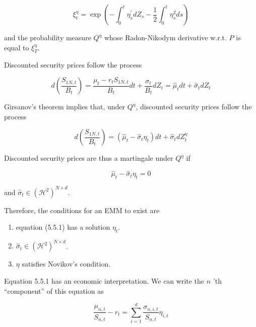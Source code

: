 \documentclass[\topdir/lecture\_notes.tex]{subfiles}
\begin{document}
\begin{equation*}
\xi_{t}^{\eta}=\exp \left(-\int_{0}^{t} \eta_{s}^{\prime} d Z_{s}-\frac{1}{2} \int_{0}^{t} \eta_{s}^{2} d s\right)
\end{equation*}

and the probability measure \(Q^{\eta}\) whose Radon-Nikodym derivative w.r.t. \(P\) is equal to \(\xi_{T}^{\eta}\).

Discounted security prices follow the process

\begin{equation*}
d\left(\frac{S_{1 N, t}}{B_{t}}\right)=\frac{\mu_{t}-r_{t} S_{1 N, t}}{B_{t}} d t+\frac{\sigma_{t}}{B_{t}} d Z_{t}=\hat{\mu}_{t} d t+\hat{\sigma}_{t} d Z_{t}
\end{equation*}

Girsanov's theorem implies that, under \(Q^{\eta}\), discounted security prices follow the process

\begin{equation*}
d\left(\frac{S_{1 N, t}}{B_{t}}\right)=\left(\hat{\mu}_{t}-\hat{\sigma}_{t} \eta_{t}\right) d t+\hat{\sigma}_{t} d Z_{t}^{\eta}
\end{equation*}

Discounted security prices are thus a martingale under \(Q^{\eta}\) if

\begin{equation}
\hat{\mu}_{t}-\hat{\sigma}_{t} \eta_{t}=0 \label{eq:martingale_condition}
\end{equation}

and \(\hat{\sigma}_{t} \in\left(\mathcal{H}^{2}\right)^{N \times d}\).

Therefore, the conditions for an EMM to exist are

\begin{enumerate}
  \item equation (5.5.1) has a solution \(\eta_{t}\).
  \item \(\hat{\sigma}_{t} \in\left(\mathcal{H}^{2}\right)^{N \times d}\).
  \item \(\eta\) satisfies Novikov's condition.
\end{enumerate}

Equation 5.5.1 has an economic interpretation. We can write the \(n\) 'th ``component'' of this equation as

\begin{equation*}
\frac{\mu_{n, t}}{S_{n, t}}-r_{t}=\sum_{i=1}^{d} \frac{\sigma_{n, i, t}}{S_{n, t}} \eta_{i, t}
\end{equation*}
\end{document}

